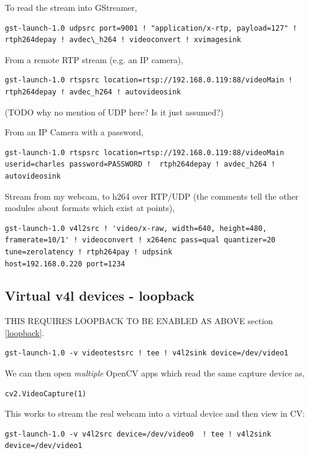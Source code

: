 \documentclass[oneside,english]{scrbook}
\begin{document}
To read the stream into GStreamer,
\begin{lstlisting}
gst-launch-1.0 udpsrc port=9001 ! "application/x-rtp, payload=127" ! rtph264depay ! avdec\_h264 ! videoconvert ! xvimagesink
\end{lstlisting}

From a remote RTP stream (e.g. an IP camera),
\begin{lstlisting}
gst-launch-1.0 rtspsrc location=rtsp://192.168.0.119:88/videoMain !  rtph264depay ! avdec_h264 ! autovideosink
\end{lstlisting}
(TODO why no mention of UDP here? Is it just assumed?)

From an IP Camera with a password,
\begin{lstlisting}
gst-launch-1.0 rtspsrc location=rtsp://192.168.0.119:88/videoMain userid=charles password=PASSWORD !  rtph264depay ! avdec_h264 ! autovideosink
\end{lstlisting}

Stream from my webcam, to h264 over RTP/UDP (the comments tell the other modules about formats which exist at points),
\begin{lstlisting}
gst-launch-1.0 v4l2src ! 'video/x-raw, width=640, height=480, framerate=10/1' ! videoconvert ! x264enc pass=qual quantizer=20 tune=zerolatency ! rtph264pay ! udpsink
host=192.168.0.220 port=1234
\end{lstlisting}


\subsection{Virtual v4l devices - loopback}

THIS REQUIRES LOOPBACK TO BE ENABLED AS ABOVE section \ref{loopback}.

\begin{lstlisting}
gst-launch-1.0 -v videotestsrc ! tee ! v4l2sink device=/dev/video1 
\end{lstlisting}

We can then open {\em multiple} OpenCV apps which read the same capture device as,
\begin{lstlisting}
cv2.VideoCapture(1)
\end{lstlisting}

This works to stream the real webcam into a virtual device and then view in CV:
\begin{lstlisting}
gst-launch-1.0 -v v4l2src device=/dev/video0  ! tee ! v4l2sink device=/dev/video1
\end{lstlisting}
\end{document}
